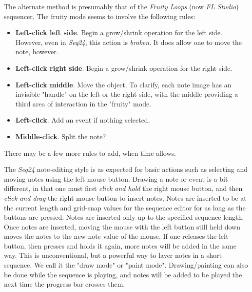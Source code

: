   The alternate method is presumably that of the \textsl{Fruity Loops}
   (now \textsl{FL Studio}) sequencer.  The fruity mode seems to involve the
   following rules:

   \begin{itemize}
      \item \textbf{Left-click left side}.
         Begin a grow/shrink operation for the left side.
         However, even in \textsl{Seq24}, this action is \textsl{broken}.
         It does allow one to move the note, however.
      \item \textbf{Left-click right side}.
         Begin a grow/shrink operation for the right side.
      \item \textbf{Left-click middle}.
         Move the object.  To clarify, each note image
         has an invisible "handle" on the left or the right side, with the
         middle providing a third area of interaction in the "fruity" mode.
      \item \textbf{Left-click}.
         Add an event if nothing selected.
      \item \textbf{Middle-click}.
         Split the note?
   \end{itemize}

   There may be a few more rules to add, when time allows.


   The \textsl{Seq24} note-editing style is as expected for basic
   actions such as selecting and moving notes using the left mouse button.
   Drawing a note or event is a bit different, in that one must first
   \textsl{click and hold} the right mouse button, and then
   \textsl{click and drag} the right mouse button to insert notes,
   Notes are inserted to be at the current length and grid-snap values for
   the sequence editor for as long as the buttons are pressed.
   Notes are inserted only up to the specified sequence length.
   Once notes are inserted, moving the mouse with the left button still
   held down moves the notes to the new note value of the mouse.
   If one releases the left button, then presses and holds it again,
   more notes will be added in the same way.
   This is unconventional, but a powerful way to layer notes in a short
   sequence.
   We call it the
   "draw mode" or
   "paint mode".
   Drawing/painting can also be done while the sequence is playing,
   and notes will be added to be played the next time the progress bar crosses
   them.

